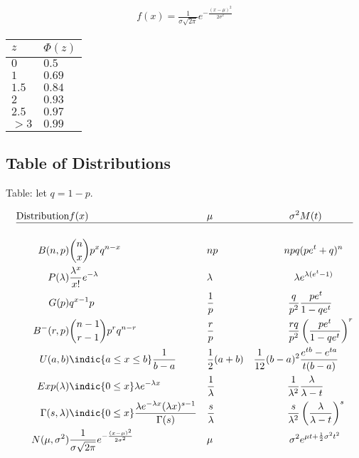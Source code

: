 \begin{align*}
f(x) = \frac{1}{\sigma \sqrt{2\pi}}e^{-\frac{(x-\mu)^2}{2\sigma^2}}
\end{align*}

\begin{longtable}[]{@{}ll@{}}
\toprule
\(z\) & \(\Phi(z)\)\tabularnewline
\midrule
\endhead
\(0\) & \(0.5\)\tabularnewline
\(1\) & \(0.69\)\tabularnewline
\(1.5\) & \(0.84\)\tabularnewline
\(2\) & \(0.93\)\tabularnewline
\(2.5\) & \(0.97\)\tabularnewline
\(>3\) & \(0.99\)\tabularnewline
\bottomrule
\end{longtable}

\hypertarget{table-of-distributions}{%
\subsection{Table of Distributions}\label{table-of-distributions}}

Table: let \(q = 1-p\).

\begin{align*}
\text{Distribution} & f(x)                                                                            &  & \mu              & \sigma^2            & M(t) \\
\hline \\
B(n, p)             & {n\choose x}p^x q^{n-x}                                                         &  & np               & npq                 & (pe^t + q)^n
\\
P(\lambda)          & \frac{\lambda^x}{x!}e^{-\lambda}                                                &  & \lambda          & \lambda             & e^{\lambda(e^t-1)}
\\
G(p)                & q^{x-1}p                                                                        &  & \frac{1}{p}      & \frac{q}{p^2}       & \frac{pe^t}{1-qe^t}
\\
B^-(r, p)           & {n-1 \choose r-1}p^rq^{n-r}                                                     &  & \frac{r}{p}      & \frac{rq}{p^2}      & \left(\frac{pe^t}{1-qe^t}\right)^r
\\
U(a, b)             & \indic{a\leq x\leq b}\frac 1 {b-a}                                          &  & \frac{1}{2}(a+b) & \frac{1}{12}(b-a)^2 & \frac{e^{tb} - e^{ta}}{t(b-a)}
\\
Exp(\lambda)        & \indic{0 \leq x}\lambda e^{-\lambda x}                                      &  & \frac 1 \lambda  & \frac 1 {\lambda^2} & \frac \lambda {\lambda - t}
\\
\Gamma(s, \lambda)  & \indic{0 \leq x} \frac{\lambda e^{-\lambda x} (\lambda x)^{s-1}}{\Gamma(s)} &  & \frac s \lambda  & \frac s {\lambda^2} & \left( \frac{\lambda}{\lambda - t} \right)^s \\
N(\mu, \sigma^2)    & \frac{1}{\sigma \sqrt{2\pi}}e^{-\frac{(x-\mu)^2}{2\sigma^2}}                    &  & \mu              & \sigma^2            & e^{\mu t + \frac{1}{2}\sigma^2 t^2}
\end{align*}

